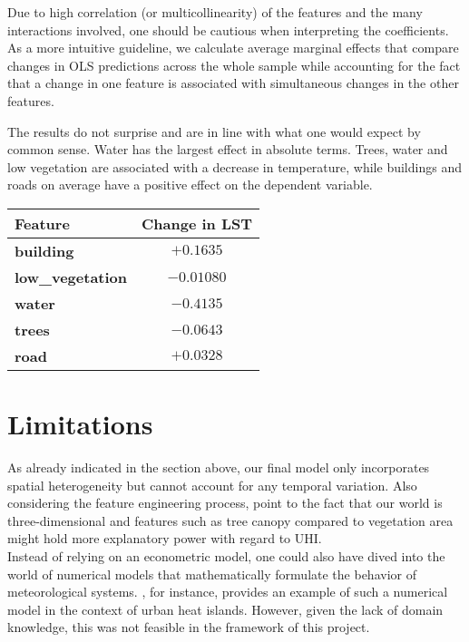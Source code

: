 \documentclass[12pt]{article}
\begin{document}
Due to high correlation (or multicollinearity) of the features and the many interactions involved, one should be cautious when interpreting the coefficients. As a more intuitive guideline, we calculate average marginal effects that compare changes in OLS predictions across the whole sample while accounting for the fact that a change in one feature is associated with simultaneous changes in the other features.

The results do not surprise and are in line with what one would expect by common sense. Water has the largest effect in absolute terms. Trees, water and low vegetation are associated with a decrease in temperature, while buildings and roads on average have a positive effect on the dependent variable.

\begin{center}
\begin{tabular}{lc}
\textbf{Feature} & \textbf{Change in LST} \\
\midrule
\textbf{building} & $+0.1635$  \\
\textbf{low\_vegetation} & $-0.01080$  \\
\textbf{water} & $-0.4135$  \\
\textbf{trees} & $-0.0643$  \\
\textbf{road} & $+0.0328$  \\
\bottomrule
\end{tabular}
\end{center}


\section{Limitations}

As already indicated in the section above, our final model only incorporates spatial heterogeneity but cannot account for any temporal variation. Also considering the feature engineering process, \citet{deilami2018} point to the fact that our world is three-dimensional and features such as tree canopy compared to vegetation area might hold more explanatory power with regard to UHI.\\
Instead of relying on an econometric model, one could also have dived into the world of numerical models that mathematically formulate the behavior of meteorological systems. \citet{bueno2012}, for instance, provides an example of such a numerical model in the context of urban heat islands. However, given the lack of domain knowledge, this was not feasible in the framework of this project. 
\end{document}
